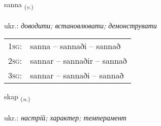 \documentclass[frontgrid, backgrid]{flacards}\usepackage[]{graphicx}\usepackage[]{xcolor}
\begin{document}
\renewcommand{\flhead}{\vskip5pt \fboxsep=0pt {\small\bfseries\footnotesize Sagnorð | дієслово}}
\renewcommand{\fcfoot}{\vskip5pt \fboxsep=0pt \hspace{2pt}{\small\bfseries\footnotesize 2K}}

\renewcommand{\blhead}{\vskip5pt {\small\bfseries\footnotesize Sagnorð | дієслово }}
\renewcommand{\bcfoot}{\vskip5pt \hspace{2pt}{\small\bfseries\footnotesize 2K}}


{sanna \small{\textsubscript{(\textit{v.})}} \\[1ex] %
\textphonetic{[sana]} \\
ukr.: \emph{доводити; встановлювати; демонструвати} \\  [2ex]
\renewcommand*{\arraystretch}{0.8}
\begin{tabular}{p{1cm}l}
\textsc{1sg}: & sanna -- sannaði -- sannað \\ 
\textsc{2sg}: & sannar -- sannaðir -- sannað \\ 
\textsc{3sg}: & sannar -- sannaði -- sannað \\ 
\end{tabular}
}

\renewcommand{\flhead}{\vskip5pt \fboxsep=0pt {\small\bfseries\footnotesize Nafnorð | іменник}}
\renewcommand{\fcfoot}{\vskip5pt \fboxsep=0pt \hspace{2pt}{\small\bfseries\footnotesize 2K}}

\renewcommand{\blhead}{\vskip5pt {\small\bfseries\footnotesize Nafnorð | іменник }}
\renewcommand{\bcfoot}{\vskip5pt \hspace{2pt}{\small\bfseries\footnotesize 2K}}


{skap \small{\textsubscript{(\textit{n.})}} \\[1ex] %
\textphonetic{[skaːp]} \\
ukr.: \emph{настрій; характер; темперамент} \\  [2ex]
\renewcommand*{\arraystretch}{0.8}
}
\end{document}
